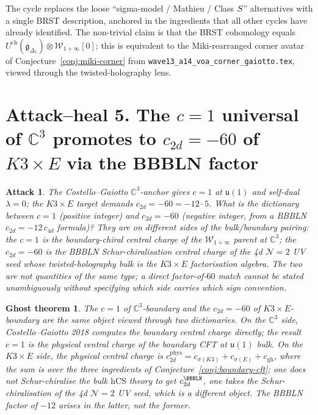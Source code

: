 \documentclass[11pt]{article}
\newtheorem*{ghost}{Ghost theorem}
\newtheorem*{attack}{Attack}
\providecommand{\C}{\mathbb{C}}
\providecommand{\cN}{\mathcal{N}}
\providecommand{\cW}{\mathcal{W}}
\providecommand{\fg}{\mathfrak{g}}
\providecommand{\fu}{\mathfrak{u}}
\providecommand{\hCS}{\mathrm{hCS}}
\begin{document}
The cycle replaces the loose ``sigma-model / Mathieu / Class $S$''
alternatives with a single BRST description, anchored in the ingredients
that all other cycles have already identified. The non-trivial claim is
that the BRST cohomology equals $U^{\mathrm{ch}}(\fg_{\Delta_5})
\otimes\cW_{1+\infty}[0]$; this is equivalent to the Miki-rearranged
corner avatar of Conjecture~\ref{conj:miki-corner} from
\texttt{wave13\_a14\_voa\_corner\_gaiotto.tex}, viewed through the
twisted-holography lens.

\section{Attack--heal 5. The $c = 1$ universal of $\C^3$ promotes to
  $c_{2d} = -60$ of $K3\times E$ via the BBBLN factor}
\label{sec:cycle5}

\begin{attack}
The Costello--Gaiotto $\C^3$-anchor gives $c = 1$ at $\fu(1)$ and
self-dual $\lambda = 0$; the $K3 \times E$ target
demands $c_{2d} = -60 = -12\cdot 5$. What is the dictionary between
$c = 1$ (positive integer) and $c_{2d} = -60$ (negative integer, from
a BBBLN $c_{2d} = -12\,c_{4d}$ formula)? They are on different sides
of the bulk/boundary pairing: the $c = 1$ is the boundary-chiral
central charge of the $\cW_{1+\infty}$ parent at $\C^3$; the $c_{2d}
= -60$ is the BBBLN Schur-chiralisation central charge of the 4d
$\cN{=}2$ UV seed whose twisted-holography bulk is the
$K3\times E$ factorisation algebra. The two are not quantities of
the same type; a direct factor-of-$60$ match cannot be stated
unambiguously without specifying which side carries which sign
convention.
\end{attack}

\begin{ghost}
\emph{The $c = 1$ of $\C^3$-boundary and the $c_{2d} = -60$ of
$K3\times E$-boundary are the \emph{same} object viewed through two
dictionaries. On the $\C^3$ side, Costello--Gaiotto 2018 computes the
boundary central charge directly; the result $c = 1$ is the physical
central charge of the boundary CFT at $\fu(1)$ bulk. On the $K3\times E$
side, the physical central charge is $c_{2d}^{\mathrm{phys}} =
c_{\sigma(K3)} + c_{\sigma(E)} + c_{\mathrm{gh}}$, where the sum is
over the three ingredients of Conjecture~\ref{conj:boundary-cft};
\emph{one does not Schur-chiralise the bulk $\hCS$ theory to get
$c_{2d}^{\BBBLN}$, one takes the Schur-chiralisation of the 4d
$\cN{=}2$ UV seed, which is a different object. The BBBLN factor of
$-12$ arises in the latter, not the former.}}
\end{ghost}
\end{document}
